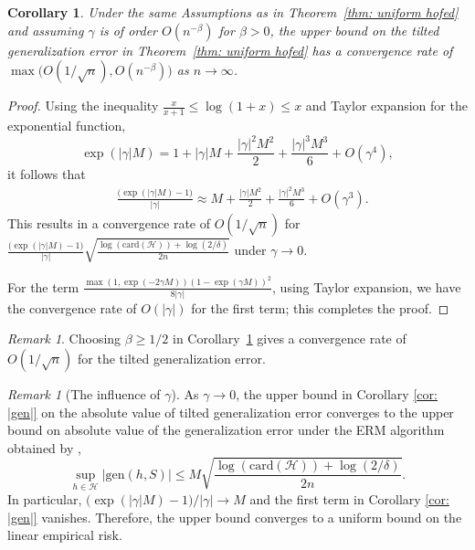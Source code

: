 \documentclass{article}
\theoremstyle{plain}
\theoremstyle{plain}
\newtheorem{corollary}[theorem]{Corollary}
\theoremstyle{definition}
\theoremstyle{remark}
\newtheorem{remark}[theorem]{Remark}
\begin{document}
\begin{corollary}\label{Cor: conv rate hofe}
  Under the same Assumptions as in Theorem~\ref{thm: uniform hofed} and assuming $\gamma$ is of order $O(n^{-\beta})$ for $\beta>0$, the upper bound on the tilted generalization error in Theorem~\ref{thm: uniform hofed} has a convergence rate of $\max\big(O(1/\sqrt{n}),O(n^{-\beta})\big)$ as $n\rightarrow \infty$.   
\end{corollary}
\begin{proof}
    Using the inequality $\frac{x}{x+1}\leq\log(1+x)\leq x$ and  Taylor expansion for the exponential function,
    \begin{equation}
\exp(|\gamma|M)=1+|\gamma|M+\frac{|\gamma|^2 M^2}{2}+\frac{|\gamma|^3M^3}{6}+O(\gamma^4),
    \end{equation}
    it follows that 
     \begin{equation}
     \begin{split}
         &\frac{\big(\exp(|\gamma|M)-1\big)}{|\gamma|}
         \approx M+\frac{|\gamma| M^2}{2}+\frac{|\gamma|^2M^3}{6}+O(\gamma^3).
    \end{split}
    \end{equation}
 This results in a convergence rate of $O(1/\sqrt{n})$ for $\frac{\big(\exp(|\gamma|M)-1\big)}{|\gamma|}\sqrt{\frac{\log(\mathrm{card}(\mathcal{H}))+\log(2/\delta)}{2n}}$ under $\gamma\rightarrow 0$.

    For the term $\frac{\max(1,\exp(-2\gamma M))(1-\exp(\gamma M))^2}{8|\gamma|}$, using Taylor expansion,  we have the convergence rate of $O(|\gamma|)$ for the first term; this completes the proof.
\end{proof}

\begin{remark}\label{rem: conv rate}
    Choosing $\beta\geq1/2$ in Corollary~\ref{Cor: conv rate hofe} gives a convergence rate of $O(1/\sqrt{n})$ for the tilted generalization error.
\end{remark}

\begin{remark}[The influence of $\gamma$]
   As $\gamma\rightarrow 0$, the upper bound in Corollary \ref{cor: |gen|} on the absolute value of tilted generalization error converges to the upper bound on absolute value of the generalization error under the ERM algorithm obtained by \citet{shalev2014understanding},
    \begin{equation}\label{eq: gen linear}\sup_{h\in\mathcal{H}}|\mathrm{gen}(h,S)|\leq M\sqrt{\frac{\log(\mathrm{card}(\mathcal{H}))+\log(2/\delta)}{2n}}.\end{equation} In particular,  ${\big(\exp(|\gamma|M)-1\big)}/{|\gamma|}\rightarrow M$ and the first term in Corollary \ref{cor: |gen|} vanishes. Therefore, the upper bound converges to a uniform bound on the linear empirical risk.
\end{remark}
\end{document}
